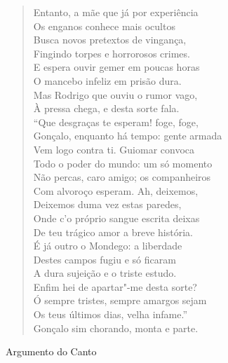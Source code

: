 \begin{verse}
Entanto, a mãe que já por experiência\\
Os enganos conhece mais ocultos\\
Busca novos pretextos de vingança,\\
Fingindo torpes e horrorosos crimes.\\
E espera ouvir gemer em poucas horas\\
O mancebo infeliz em prisão dura.\\
Mas Rodrigo que ouviu o rumor vago,\\
À pressa chega, e desta sorte fala. \\[10pt]


``Que desgraças te esperam! foge, foge,\\
Gonçalo, enquanto há tempo: gente armada\\
Vem logo contra ti. Guiomar convoca\\
Todo o poder do mundo: um só momento\\
Não percas, caro amigo; os companheiros\\
Com alvoroço esperam. Ah, deixemos,\\
Deixemos duma vez estas paredes,\\
Onde c'o próprio sangue escrita deixas\\
De teu trágico amor a breve história.\\		
É já outro o Mondego: a liberdade\\			\index{\Monde}
Destes campos fugiu e só ficaram\\
A dura sujeição e o triste estudo.\\
Enfim hei de apartar"-me desta sorte?\\ 
Ó sempre tristes, sempre amargos sejam\\
Os teus últimos dias, velha infame.''\\
Gonçalo sim chorando, monta e parte. \\[10pt]
\end{verse}
\pagebreak 

\mbox{}\vfill
\thispagestyle{empty}
\noindent Argumento do Canto 
\medskip

